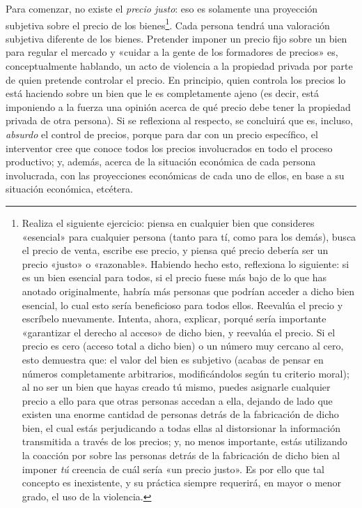 \documentclass[12pt,a4paper,twoside]{book}
\begin{document}
Para comenzar, no existe el \textit{precio justo}: eso es solamente una proyección subjetiva sobre el precio de los bienes\footnote{Realiza el siguiente ejercicio: piensa en cualquier bien que consideres «esencial» para cualquier persona (tanto para tí, como para los demás), busca el precio de venta, escribe ese precio, y piensa qué precio debería ser un precio «justo» o «razonable». Habiendo hecho esto, reflexiona lo siguiente: si es un bien esencial para todos, si el precio fuese más bajo de lo que has anotado originalmente, habría más personas que podrían acceder a dicho bien esencial, lo cual esto sería beneficioso para todos ellos. Reevalúa el precio y escríbelo nuevamente. Intenta, ahora, explicar, porqué sería importante «garantizar el derecho al acceso» de dicho bien, y reevalúa el precio. Si el precio es cero (acceso total a dicho bien) o un número muy cercano al cero, esto demuestra que: el valor del bien es subjetivo (acabas de pensar en números completamente arbitrarios, modificándolos según tu criterio moral); al no ser un bien que hayas creado tú mismo, puedes asignarle cualquier precio a ello para que otras personas accedan a ella, dejando de lado que existen una enorme cantidad de personas detrás de la fabricación de dicho bien, el cual estás perjudicando a todas ellas al distorsionar la información transmitida a través de los precios; y, no menos importante, estás utilizando la coacción por sobre las personas detrás de la fabricación de dicho bien al imponer \textit{tú} creencia de cuál sería «un precio justo». Es por ello que tal concepto es inexistente, y su práctica siempre requerirá, en mayor o menor grado, el uso de la violencia.}. Cada persona tendrá una valoración subjetiva diferente de los bienes. Pretender imponer un precio fijo sobre un bien para regular el mercado y «cuidar a la gente de los formadores de precios» es, conceptualmente hablando, un acto de violencia a la propiedad privada por parte de quien pretende controlar el precio. En principio, quien controla los precios lo está haciendo sobre un bien que le es completamente ajeno (es decir, está imponiendo a la fuerza una opinión acerca de qué precio debe tener la propiedad privada de otra persona). Si se reflexiona al respecto, se concluirá que es, incluso, \textit{absurdo} el control de precios, porque para dar con un precio específico, el interventor cree que conoce todos los precios involucrados en todo el proceso productivo; y, además, acerca de la situación económica de cada persona involucrada, con las proyecciones económicas de cada uno de ellos, en base a su situación económica, etcétera.
\end{document}
